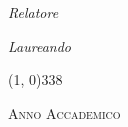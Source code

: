 \begin{titlepage}
\begin{center}
        \begin{large}
            \begin{flushleft}
                \textit{Relatore}\\
                \vspace{5pt}
                \profTitle \myProf
            \end{flushleft}

            \vspace{0pt}

            \begin{flushright}
                \textit{Laureando}\\
                \vspace{5pt}
                \myName
            \end{flushright}
        \end{large}

        \vspace{22pt}

        \line(1, 0){338} \\
        \vspace{0pt}
        \begin{normalsize}
            \textsc{Anno Accademico \myAA}
        \end{normalsize}

    \end{center}
\end{titlepage}